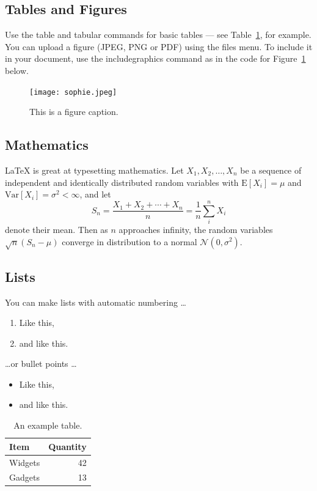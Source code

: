 
\subsection{Tables and Figures}

Use the table and tabular commands for basic tables --- see Table~\ref{tab:widgets}, for example. You can upload a figure (JPEG, PNG or PDF) using the files menu. To include it in your document, use the includegraphics command as in the code for Figure~\ref{fig:sophie} below.

\begin{figure}[h]
\centering
\texttt{[image: sophie.jpeg]}
\caption{\label{fig:sophie}This is a figure caption.}
\end{figure}


\subsection{Mathematics}

\LaTeX{} is great at typesetting mathematics. Let $X_1, X_2, \ldots, X_n$ be a sequence of independent and identically distributed random variables with $\text{E}[X_i] = \mu$ and $\text{Var}[X_i] = \sigma^2 < \infty$, and let
$$S_n = \frac{X_1 + X_2 + \cdots + X_n}{n}
      = \frac{1}{n}\sum_{i}^{n} X_i$$
denote their mean. Then as $n$ approaches infinity, the random variables $\sqrt{n}(S_n - \mu)$ converge in distribution to a normal $\mathcal{N}(0, \sigma^2)$.

\subsection{Lists}

You can make lists with automatic numbering \dots

\begin{enumerate}
\item Like this,
\item and like this.
\end{enumerate}
\dots or bullet points \dots
\begin{itemize}
\item Like this,
\item and like this.
\end{itemize}


\begin{table}
\centering
\begin{tabular}{l|r}
Item & Quantity \\\hline
Widgets & 42 \\
Gadgets & 13
\end{tabular}
\caption{\label{tab:widgets}An example table.}
\end{table}


